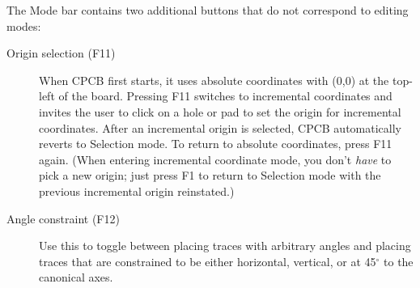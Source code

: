 \documentclass[11pt]{report}
\begin{document}
The Mode bar contains two additional buttons that do not correspond to
editing modes:
\begin{description}
      \item[Origin selection (F11)] When CPCB first starts, it uses
        absolute coordinates with (0,0) at the top-left of the
        board. Pressing F11 switches to incremental coordinates and
        invites the user to click on a hole or pad to set the
        origin for incremental coordinates. After an incremental
        origin is selected, CPCB automatically reverts to
        Selection mode. To return to absolute coordinates, press
        F11 again. (When entering incremental coordinate mode,
        you don't \emph{have} to pick a new origin; just press
        F1 to return to Selection mode with the previous
        incremental origin reinstated.)
      \item[Angle constraint (F12)] Use this to toggle between placing
        traces with arbitrary angles and placing traces that are
        constrained to be either horizontal, vertical, or at
        45$^\circ$ to the canonical axes.
\end{description}
\end{document}

